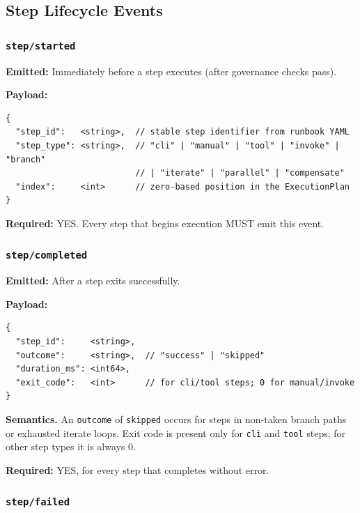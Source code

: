 \subsection{Step Lifecycle Events}

\subsubsection{\texttt{step/started}}

\textbf{Emitted:} Immediately before a step executes (after governance checks pass).

\textbf{Payload:}
\begin{verbatim}
{
  "step_id":   <string>,  // stable step identifier from runbook YAML
  "step_type": <string>,  // "cli" | "manual" | "tool" | "invoke" | "branch"
                          // | "iterate" | "parallel" | "compensate"
  "index":     <int>      // zero-based position in the ExecutionPlan
}
\end{verbatim}

\textbf{Required:} YES. Every step that begins execution MUST emit this event.


\subsubsection{\texttt{step/completed}}

\textbf{Emitted:} After a step exits successfully.

\textbf{Payload:}
\begin{verbatim}
{
  "step_id":     <string>,
  "outcome":     <string>,  // "success" | "skipped"
  "duration_ms": <int64>,
  "exit_code":   <int>      // for cli/tool steps; 0 for manual/invoke
}
\end{verbatim}

\textbf{Semantics.} An \texttt{outcome} of \texttt{skipped} occurs for steps in non-taken branch paths or exhausted iterate loops. Exit code is present only for \texttt{cli} and \texttt{tool} steps; for other step types it is always 0.

\textbf{Required:} YES, for every step that completes without error.


\subsubsection{\texttt{step/failed}}

